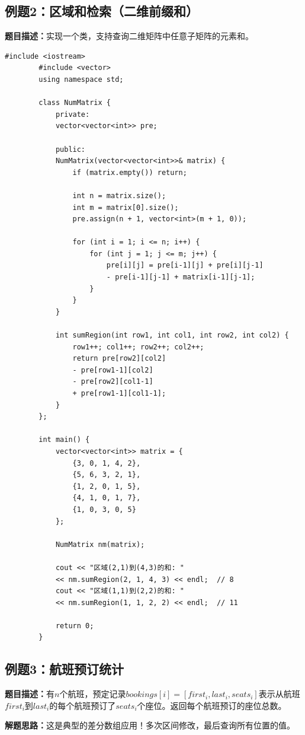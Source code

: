 \documentclass[12pt,a4paper]{article}
\begin{document}
	\subsection{例题2：区域和检索（二维前缀和）}
	
	\textbf{题目描述：}实现一个类，支持查询二维矩阵中任意子矩阵的元素和。
	
	\begin{lstlisting}[caption={例题2：二维区域和检索}]
		#include <iostream>
		#include <vector>
		using namespace std;
		
		class NumMatrix {
			private:
			vector<vector<int>> pre;
			
			public:
			NumMatrix(vector<vector<int>>& matrix) {
				if (matrix.empty()) return;
				
				int n = matrix.size();
				int m = matrix[0].size();
				pre.assign(n + 1, vector<int>(m + 1, 0));
				
				for (int i = 1; i <= n; i++) {
					for (int j = 1; j <= m; j++) {
						pre[i][j] = pre[i-1][j] + pre[i][j-1] 
						- pre[i-1][j-1] + matrix[i-1][j-1];
					}
				}
			}
			
			int sumRegion(int row1, int col1, int row2, int col2) {
				row1++; col1++; row2++; col2++;
				return pre[row2][col2] 
				- pre[row1-1][col2] 
				- pre[row2][col1-1] 
				+ pre[row1-1][col1-1];
			}
		};
		
		int main() {
			vector<vector<int>> matrix = {
				{3, 0, 1, 4, 2},
				{5, 6, 3, 2, 1},
				{1, 2, 0, 1, 5},
				{4, 1, 0, 1, 7},
				{1, 0, 3, 0, 5}
			};
			
			NumMatrix nm(matrix);
			
			cout << "区域(2,1)到(4,3)的和: " 
			<< nm.sumRegion(2, 1, 4, 3) << endl;  // 8
			cout << "区域(1,1)到(2,2)的和: " 
			<< nm.sumRegion(1, 1, 2, 2) << endl;  // 11
			
			return 0;
		}
	\end{lstlisting}
	
	\subsection{例题3：航班预订统计}
	
	\textbf{题目描述：}有$n$个航班，预定记录$bookings[i] = [first_i, last_i, seats_i]$表示从航班$first_i$到$last_i$的每个航班预订了$seats_i$个座位。返回每个航班预订的座位总数。
	
	\textbf{解题思路：}这是典型的差分数组应用！多次区间修改，最后查询所有位置的值。
	
\end{document}
